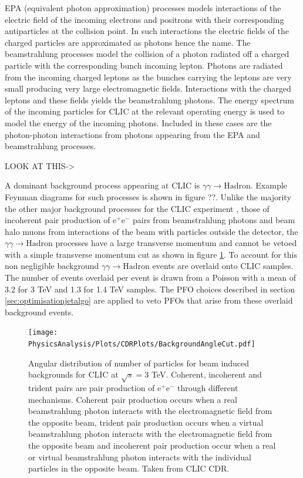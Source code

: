 EPA (equivalent photon approximation) processes models interactions of the electric field of the incoming electrons and positrons with their corresponding antiparticles at the collision point. In such interactions the electric fields of the charged particles are approximated as photons hence the name. The beamstrahlung processes model the collision of a photon radiated off a charged particle with the corresponding bunch incoming lepton. Photons are radiated from the incoming charged leptons as the bunches carrying the leptons are very small producing very large electromagnetic fields. Interactions with the charged leptons and these fields yields the beamstrahlung photons. The energy spectrum of the incoming particles for CLIC at the relevant operating energy is used to model the energy of the incoming photons. Included in these cases are the photon-photon interactions from photons appearing from the EPA and beamstrahlung processes.

LOOK AT THIS->

A dominant background process appearing at CLIC is $\gamma\gamma \rightarrow \text{Hadron}$.  Example Feynman diagrams for such processes is shown in figure ??.  Unlike the majority the other major background processes for the CLIC experiment \cite{Linssen:2012hp}, those of incoherent pair production of $\text{e}^{+}\text{e}^{-}$ pairs from beamstrahlung photons and beam halo muons from interactions of the beam with particles outside the detector, the $\gamma\gamma \rightarrow \text{Hadron}$ processes have a large transverse momentum and cannot be vetoed with a simple transverse momentum cut as shown in figure \ref{fig:backgroundangle}. To account for this non negligible background $\gamma\gamma \rightarrow \text{Hadron}$ events are overlaid onto CLIC samples. The number of events overlaid per event is drawn from a Poisson with a mean of 3.2 for 3 TeV and 1.3 for 1.4 TeV samples.  The PFO choices described in section \ref{sec:optimisationjetalgo} are applied to veto PFOs that arise from these overlaid background events.

\begin{figure}
\texttt{[image: PhysicsAnalysis/Plots/CDRPlots/BackgroundAngleCut.pdf]}
\caption[]{Angular distribution of number of particles for beam induced backgrounds for CLIC at $\sqrt{s} = 3$ TeV.  Coherent, incoherent and trident pairs are pair production of $\text{e}^{+}\text{e}^{-}$ through different mechanisms.  Coherent pair production occurs when a real beamstrahlung photon interacts with the electromagnetic field from the opposite beam, trident pair production occurs when a virtual beamstrahlung photon interacts with the electromagnetic field from the opposite beam and incoherent pair production occur when a real or virtual beamstrahlung photon interacts with the individual particles in the opposite beam.  Taken from CLIC CDR.}
\label{fig:backgroundangle}
\end{figure}

